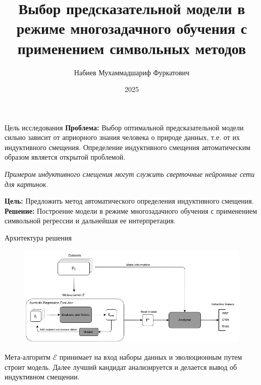 \documentclass{beamer}
\title[\hbox to 56mm{Индуктивное смещение}]{Выбор предсказательной модели в режиме многозадачного обучения с применением символьных методов}
\author[М.\,Ф. Набиев]{
    Набиев Мухаммадшариф Фуркатович
}
\institute[Московский физико-технический институт]{
\small{
    Московский физико-технический институт \\
    Кафедра интеллектуальных систем ФПМИ МФТИ 
}}
\date{2025}
\begin{document}
\begin{frame}
\thispagestyle{empty}
\maketitle
\end{frame}
\begin{frame}{Цель исследования}
\textbf{Проблема:} Выбор оптимальной предсказательной модели сильно зависит от априорного знания человека о природе данных, т.е. от их индуктивного смещения. Определение индуктивного смещения автоматическим образом является открытой проблемой. 
\vspace{12}
\begin{spacing}{0.4}
    \footnotesize \textit{Примером индуктивного смещения могут служить сверточные нейронные сети для картинок.} \newline
\end{spacing}
\vspace{12}
\textbf{Цель:} Предложить метод автоматического определения индуктивного смещения.
\newline
\newline
\textbf{Решение:} Построение модели в режиме многозадачного обучения с применением символьной регрессии и дальнейшая ее интерпретация.
\end{frame}
\begin{frame}{Архитектура решения}
\begin{figure}[t]
        \centering
        \includegraphics[width=1\textwidth]{model.png}
\end{figure}
Мета-алгоритм \(\mathcal{E}\) принимает на вход наборы данных и эволюционным путем строит модель. Далее лучший кандидат анализируется и делается вывод об индуктивном смещении.
\end{frame}
\end{document}
